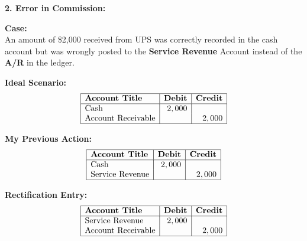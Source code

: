 \documentclass[12pt,a4paper]{book}
\begin{document}
\textbf{2. Error in Commission:}
\begin{multicols}{2}
\textbf{Case:} \\
An amount of \$2,000 received from UPS was correctly recorded in the cash account but was wrongly posted to the \textbf{Service Revenue} Account instead of the \textbf{A/R} in the ledger.

\textbf{Ideal Scenario:}
\[
\begin{array}{|l|r|r|}
\hline
\textbf{Account Title} & \textbf{Debit} & \textbf{Credit} \\
\hline
\text{Cash} & 2,000 & \\
\text{Account Receivable} & & 2,000 \\
\hline
\end{array}
\]

\textbf{My Previous Action:}
\[
\begin{array}{|l|r|r|}
\hline
\textbf{Account Title} & \textbf{Debit} & \textbf{Credit} \\
\hline
\text{Cash} & 2,000 & \\
\text{Service Revenue} & & 2,000 \\
\hline
\end{array}
\]

\textbf{Rectification Entry:}
\[
\begin{array}{|l|r|r|}
\hline
\textbf{Account Title} & \textbf{Debit} & \textbf{Credit} \\
\hline
\text{Service Revenue} & 2,000 & \\
\text{Account Receivable} & & 2,000 \\
\hline
\end{array}
\]
\end{multicols}
\vspace{0.5cm}
\end{document}
